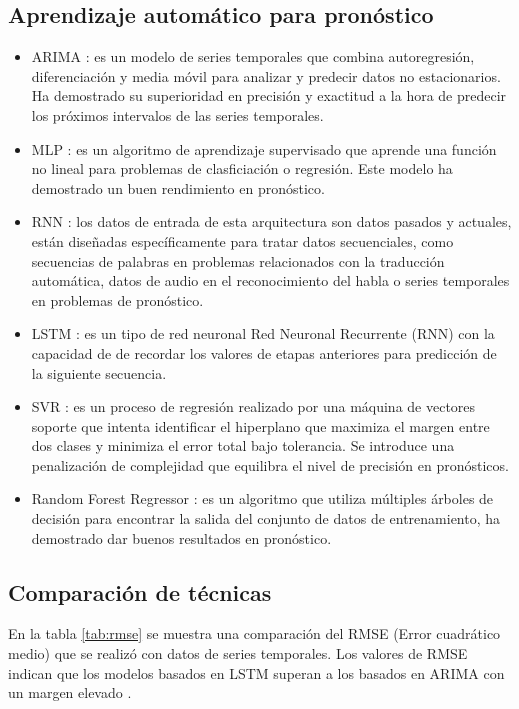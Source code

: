 \subsection{Aprendizaje automático para pronóstico}

\begin{itemize}
  \item ARIMA \citep{Siami-Namini2018}: es un modelo de series temporales que combina autoregresión,
   diferenciación y media móvil para analizar y predecir datos no estacionarios. Ha demostrado 
   su superioridad en precisión y exactitud a la hora de predecir los próximos intervalos de 
   las series temporales.
   \item MLP \citep{Feng2020}: es un algoritmo de aprendizaje supervisado que aprende una función no lineal para
   problemas de clasficiación o regresión. Este modelo ha demostrado un buen rendimiento en 
   pronóstico.
  \item RNN \citep{Sebaa2020}: los datos de entrada de esta arquitectura son datos pasados
   y actuales, están diseñadas específicamente para tratar datos secuenciales, como secuencias de 
   palabras en problemas relacionados con la traducción automática, datos de audio en el 
   reconocimiento del habla o series temporales en problemas de pronóstico.
  \item LSTM \citep{Siami-Namini2018}: es un tipo de red neuronal Red Neuronal Recurrente (RNN) con la capacidad de
   de recordar los valores de etapas anteriores para predicción de la siguiente secuencia.
  \item SVR \citep{Makridakis2018}: es un proceso de regresión realizado por una máquina de vectores soporte que intenta
   identificar el hiperplano que maximiza el margen entre dos clases y minimiza el error total bajo 
   tolerancia. Se introduce una penalización de complejidad que equilibra el nivel de precisión en 
   pronósticos.
  \item Random Forest Regressor \citep{Nyemeche2023}: es un algoritmo que utiliza múltiples árboles de decisión para
  encontrar la salida del conjunto de datos de entrenamiento, ha demostrado dar buenos resultados en pronóstico.
  \end{itemize}

\subsection{Comparación de técnicas}

En la tabla \ref{tab:rmse} se muestra una comparación del RMSE (Error cuadrático medio) que se realizó
con datos de series temporales. Los valores de RMSE indican que los modelos basados en LSTM superan a los 
basados en ARIMA con un margen elevado \citep{Siami-Namini2018}.


